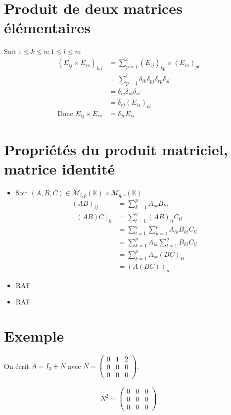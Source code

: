 \documentclass[../main.tex]{subfiles}
\begin{document}
\setcounter{section}{15}
\section{Produit de deux matrices élémentaires}
Soit $1 \leq k \leq n ; 1 \leq l \leq m$
\begin{align*} 
(E_{ij} \times E_{rs})_{k,l} &= \sum^t_{p=1}(E_{ij})_{kp} \times (E_{rs})_{pl} \\
&= \sum^t_{p=1} \delta_{ik}\delta_{pj}\delta_{rp}\delta_{sl}  \\
&= \delta_{rj}\delta_{ik}\delta_{sl} \\
&= \delta_{rj} (E_{is})_{kl} \\
\text{Donc } E_{ij} \times E_{rs} &= \delta_{jr}E_{is}
\end{align*}

\section{Propriétés du produit matriciel, matrice identité}
\begin{itemize}
    \item Soit $(A,B,C) \in \mathcal M_{i,p}(\mathbb K) \times \mathcal M_{q,r}(\mathbb K)$
    \begin{align*} 
        (AB)_{ij} &= \sum^p_{k=1} A_{ik}B_{kj} \\
        [(AB)C]_{il} &= \sum^q_{t=1} (AB)_{it} C_{tl}  \\
        &= \sum^q_{t=1} \sum^p_{k=1}A_{ik}B_{kt}C_{tl} \\
        &= \sum^p_{k=1}A_{ik}\sum^q_{t=1}B_{kt}C_{tl} \\
        &= \sum^p_{k=1}A_{ik}(BC)_{kl} \\
        &= (A(BC))_{il}
    \end{align*}
    \item RAF
    \item RAF
\end{itemize}

\setcounter{section}{23}
\section{Exemple}
On écrit $A = I_{3} + N$ avec $N = \begin{pmatrix} 0 & 1 & 2 \\ 0 & 0 & 0 \\ 0 & 0 & 0 \end{pmatrix}$. 

\begin{align*} 
N^2 = \begin{pmatrix} 0 & 0 & 0\\ 0 & 0 & 0 \\ 0 & 0 & 0 \end{pmatrix} 
\end{align*}
\end{document}
